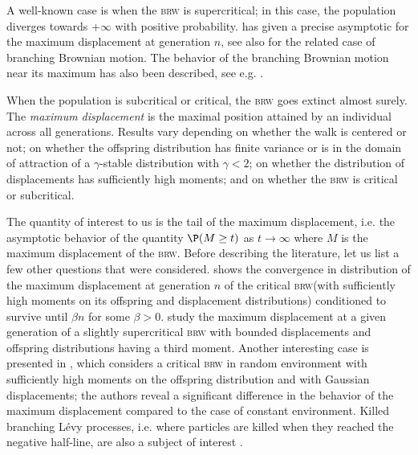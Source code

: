 \documentclass[10pt,a4paper]{article}
\newcommand{\todo}[1]{\textcolor{blue}{\textbf{TODO:} #1}}
\newcommand{\brw}{\textsc{brw}\xspace}
\begin{document}



A well-known case is when the \brw is supercritical; in this case, the population diverges towards $+\infty$ with positive probability. \cite{aidekon2013convergence} has given a precise asymptotic for the maximum displacement at generation $n$, see also \cite{bramson1978maximal} for the related case of branching Brownian motion. The behavior of the branching Brownian motion near its maximum has also been described, see e.g. \cite{aidekon2013branching}. 


When the population is subcritical or critical, the \brw goes extinct almost surely. %
The \emph{maximum displacement} is the maximal position attained by an individual across all generations. Results vary depending on whether the walk is centered or not; on whether the offspring distribution has finite variance or is in the domain of attraction of a $\gamma$-stable distribution with $\gamma<2$; on whether the distribution of displacements has sufficiently high moments; and on whether the \brw is critical or subcritical. %

The quantity of interest to us is the tail of the maximum displacement, i.e. the asymptotic behavior of the quantity $\P(M\geq t)$ as $t\to\infty$ where $M$ is the maximum displacement of the \brw. Before describing the literature, let us list a few other questions that were considered. \cite{kesten1995branching} shows the convergence in distribution of the maximum displacement at generation $n$ of the critical \brw (with sufficiently high moments on its offspring and displacement distributions) conditioned to survive until $\beta n$ for some $\beta>0$. \cite{neuman2021maximal} study the maximum displacement at a given generation of a slightly supercritical \brw with bounded displacements and offspring distributions having a third moment. 
Another interesting case is presented in \cite{fu2025maximal}, which considers a critical \brw in random environment with sufficiently high moments on the offspring distribution and with Gaussian displacements; the authors reveal a significant difference in the behavior of the maximum displacement compared to the case of constant environment. 
Killed branching Lévy processes, i.e. where particles are killed when they reached the negative half-line, are also a subject of interest \cite{zheng2015limiting, ren2025asymptotic, hou2025tailextinction, hou2025asymptotic}. 
\end{document}

